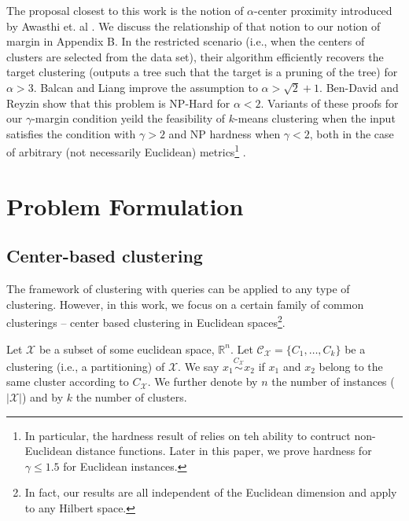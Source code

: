 \documentclass{article}
\newcommand{\mc}{\mathcal}
\begin{document}
The proposal closest to this work is the notion of $\alpha$-center proximity introduced by Awasthi et. al \cite{awasthi2012center}. We discuss the relationship of that notion to our notion of margin in Appendix B. In the restricted scenario (i.e., when the centers of clusters are selected from the data set), their algorithm efficiently recovers the target clustering (outputs a tree such that the target is a pruning of the tree) for $\alpha > 3$.  Balcan and Liang \cite{balcan2012clustering} improve the assumption to $\alpha > \sqrt{2} + 1$. Ben-David and Reyzin \cite{ben2014data} show that this problem is NP-Hard for $\alpha < 2$. 
Variants of these proofs for our $\gamma$-margin condition
yeild the feasibility of $k$-means clustering when the input satisfies the condition with $\gamma >2$ and NP hardness when $\gamma <2$, both in the case of arbitrary (not necessarily Euclidean) metrics\footnote{In particular, the hardness result of \cite{ben2014data} relies on teh ability to contruct non-Euclidean distance functions. Later in this paper, we prove hardness for $\gamma \leq 1.5$ for Euclidean instances.} .

\section{Problem Formulation}





\subsection{Center-based clustering}

The framework of clustering with queries can be applied to any type of clustering. However, in this work, we focus on a certain family of common clusterings -- center based clustering in Euclidean spaces\footnote{In fact, our results are all independent of the Euclidean dimension and apply to any Hilbert space.}.

Let ${\mc X}$ be a subset of some euclidean space, $\mathbb{R}^n$. Let $\mc C_{\mc X} = \{C_1, \ldots, C_k\}$ be a clustering (i.e., a partitioning) of $\mc X$. We say $x_1 \overset{C_{\mc X}}{\sim} x_2$ if $x_1$ and $x_2$ belong to the same cluster according to $C_{\mc X}$. We further denote by $n$ the number of instances ($|{\mc X}|$) and by $k$ the number of clusters.
\end{document}
